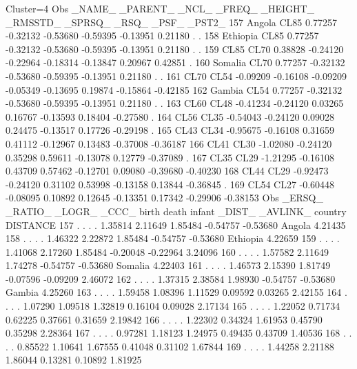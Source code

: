 \documentclass{article}
\begin{document}
\begin{Woutput}
Cluster=4
Obs _NAME_   _PARENT_   _NCL_   _FREQ_  _HEIGHT_ _RMSSTD_  _SPRSQ_  _RSQ_    _PSF_   _PST2_
157 Angola     CL85    0.77257 -0.32132 -0.53680 -0.59395 -0.13951 0.21180   .        .
158 Ethiopia   CL85    0.77257 -0.32132 -0.53680 -0.59395 -0.13951 0.21180   .        .
159 CL85       CL70    0.38828 -0.24120 -0.22964 -0.18314 -0.13847 0.20967  0.42851   .
160 Somalia    CL70    0.77257 -0.32132 -0.53680 -0.59395 -0.13951 0.21180   .        .
161 CL70       CL54   -0.09209 -0.16108 -0.09209 -0.05349 -0.13695 0.19874 -0.15864 -0.42185
162 Gambia     CL54    0.77257 -0.32132 -0.53680 -0.59395 -0.13951 0.21180   .        .
163 CL60       CL48   -0.41234 -0.24120  0.03265  0.16767 -0.13593 0.18404 -0.27580   .
164 CL56       CL35   -0.54043 -0.24120  0.09028  0.24475 -0.13517 0.17726 -0.29198   .
165 CL43       CL34   -0.95675 -0.16108  0.31659  0.41112 -0.12967 0.13483 -0.37008 -0.36187
166 CL41       CL30   -1.02080 -0.24120  0.35298  0.59611 -0.13078 0.12779 -0.37089   .
167 CL35       CL29   -1.21295 -0.16108  0.43709  0.57462 -0.12701 0.09080 -0.39680 -0.40230
168 CL44       CL29   -0.92473 -0.24120  0.31102  0.53998 -0.13158 0.13844 -0.36845   .
169 CL54       CL27   -0.60448 -0.08095  0.10892  0.12645 -0.13351 0.17342 -0.29906 -0.38153
Obs _ERSQ_ _RATIO_ _LOGR_ _CCC_  birth   death   infant  _DIST_  _AVLINK_ country  DISTANCE
157    .      .       .     .   1.35814 2.11649 1.85484 -0.54757 -0.53680 Angola    4.21435
158    .      .       .     .   1.46322 2.22872 1.85484 -0.54757 -0.53680 Ethiopia  4.22659
159    .      .       .     .   1.41068 2.17260 1.85484 -0.20048 -0.22964           3.24096
160    .      .       .     .   1.57582 2.11649 1.74278 -0.54757 -0.53680 Somalia   4.22403
161    .      .       .     .   1.46573 2.15390 1.81749 -0.07596 -0.09209           2.46072
162    .      .       .     .   1.37315 2.38584 1.98930 -0.54757 -0.53680 Gambia    4.25260
163    .      .       .     .   1.59458 1.08396 1.11529  0.09592  0.03265           2.42155
164    .      .       .     .   1.07290 1.09518 1.32819  0.16104  0.09028           2.17134
165    .      .       .     .   1.22052 0.71734 0.62225  0.37661  0.31659           2.19842
166    .      .       .     .   1.22302 0.34324 1.61953  0.45790  0.35298           2.28364
167    .      .       .     .   0.97281 1.18123 1.24975  0.49435  0.43709           1.40536
168    .      .       .     .   0.85522 1.10641 1.67555  0.41048  0.31102           1.67844
169    .      .       .     .   1.44258 2.21188 1.86044  0.13281  0.10892           1.81925


\end{Woutput}
\end{document}
